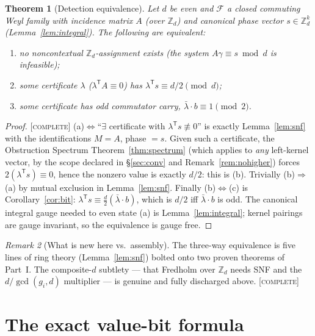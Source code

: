 \documentclass[11pt]{article}
\newtheorem{theorem}{Theorem}
\theoremstyle{definition}
\theoremstyle{remark}
\newtheorem{remark}[theorem]{Remark}
\newcommand{\Z}{\mathbb{Z}}
\newcommand{\Zd}{\Z_d}
\newcommand{\CO}{\textnormal{\textsc{[complete]}}}
\begin{document}
\begin{theorem}[Detection equivalence]\label{thm:detect}
Let $d$ be even and $\mathcal F$ a closed commuting Weyl family with incidence matrix $A$ (over
$\Zd$) and canonical phase vector $s\in\Zd^{k}$ (Lemma~\ref{lem:integral}). The following are
equivalent:
\begin{enumerate}[label=(\alph*),leftmargin=2.2em,itemsep=1pt]
\item no noncontextual $\Zd$-assignment exists (the system $A\gamma\equiv s\bmod d$ is infeasible);
\item some certificate $\lambda$ ($\lambda^{\mathsf T}A\equiv0$) has $\lambda^{\mathsf T}s\equiv
d/2\pmod d$;
\item some certificate has odd commutator carry, $\bar\lambda\cdot b\equiv1\pmod2$.
\end{enumerate}
\end{theorem}
\begin{proof}
\CO{} (a)$\Leftrightarrow$``$\exists$ certificate with $\lambda^{\mathsf T}s\not\equiv0$'' is exactly
Lemma~\ref{lem:snf} with the identifications $M=A$, phase $=s$. Given such a certificate, the
Obstruction Spectrum Theorem~\ref{thm:spectrum} (which applies to \emph{any} left-kernel vector, by
the scope declared in \S\ref{sec:conv} and Remark~\ref{rem:nohigher}) forces $2(\lambda^{\mathsf
T}s)\equiv0$, hence the nonzero value is exactly $d/2$: this is (b). Trivially (b)$\Rightarrow$(a) by
mutual exclusion in Lemma~\ref{lem:snf}. Finally (b)$\Leftrightarrow$(c) is
Corollary~\ref{cor:bit}: $\lambda^{\mathsf T}s\equiv\tfrac d2(\bar\lambda\cdot b)$, which is $d/2$ iff
$\bar\lambda\cdot b$ is odd. The canonical integral gauge needed to even state (a) is
Lemma~\ref{lem:integral}; kernel pairings are gauge invariant, so the equivalence is gauge free.
\end{proof}

\begin{remark}[What is new here vs.\ assembly]
The three-way equivalence is five lines of ring theory (Lemma~\ref{lem:snf}) bolted onto two proven
theorems of Part~I. The composite-$d$ subtlety --- that Fredholm over $\Zd$ needs SNF and the
$d/\gcd(g_i,d)$ multiplier --- is genuine and fully discharged above. \CO
\end{remark}

\section{The exact value-bit formula}\label{sec:valuebit}
\end{document}
